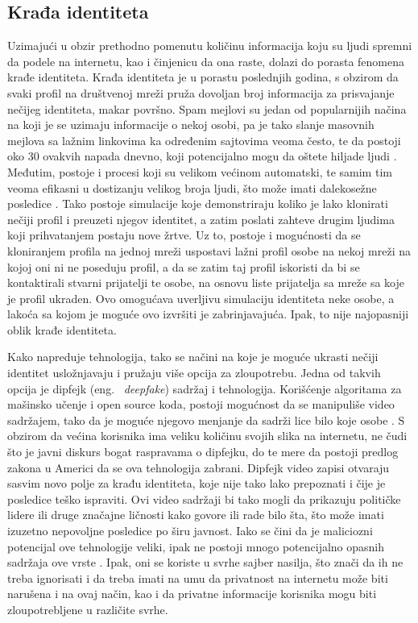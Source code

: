 \documentclass[a4paper]{article}
\begin{document}
\subsection{Krađa identiteta}
Uzimajući u obzir prethodno pomenutu količinu informacija koju su ljudi spremni da podele na internetu, kao i činjenicu da ona raste, dolazi do porasta fenomena krađe identiteta. Krađa identiteta je u porastu poslednjih godina, s obzirom da svaki profil na društvenoj mreži pruža dovoljan broj informacija za prisvajanje nečijeg identiteta, makar površno. Spam mejlovi su jedan od popularnijih načina na koji je se uzimaju informacije o nekoj osobi, pa je tako slanje masovnih mejlova sa lažnim linkovima ka određenim sajtovima veoma često, te da postoji oko 30 ovakvih napada dnevno, koji potencijalno mogu da oštete hiljade ljudi \cite{it1}. Međutim, postoje i procesi koji su velikom većinom automatski, te samim tim veoma efikasni u dostizanju velikog broja ljudi, što može imati dalekosežne posledice \cite{it2}. Tako postoje simulacije koje demonstriraju koliko je lako klonirati nečiji profil i preuzeti njegov identitet, a zatim poslati zahteve drugim ljudima koji prihvatanjem postaju nove žrtve. Uz to, postoje i mogućnosti da se kloniranjem profila na jednoj mreži uspostavi lažni profil osobe na nekoj mreži na kojoj oni ni ne poseduju profil, a da se zatim taj profil iskoristi da bi se kontaktirali stvarni prijatelji te osobe, na osnovu liste prijatelja sa mreže sa koje je profil ukraden. Ovo omogućava uverljivu simulaciju identiteta neke osobe, a lakoća sa kojom je moguće ovo izvršiti je zabrinjavajuća. Ipak, to nije najopasniji oblik krađe identiteta.
\par Kako napreduje tehnologija, tako se načini na koje je moguće ukrasti nečiji identitet usložnjavaju i pružaju više opcija za zloupotrebu. Jedna od takvih opcija je dipfejk (eng. ~{\em deepfake}) sadržaj i tehnologija. Korišćenje algoritama za mašinsko učenje i open source koda, postoji mogućnost da se manipuliše video sadržajem, tako da je moguće njegovo menjanje da sadrži lice bilo koje osobe \cite{it3}.  S obzirom da većina korisnika ima veliku količinu svojih slika na internetu, ne čudi što je javni diskurs bogat raspravama o dipfejku, do te mere da postoji predlog zakona u Americi da se ova tehnologija zabrani. Dipfejk video zapisi otvaraju sasvim novo polje za krađu identiteta, koje nije tako lako prepoznati i čije je posledice teško ispraviti. Ovi video sadržaji bi tako mogli da prikazuju političke lidere ili druge značajne ličnosti kako govore ili rade bilo šta, što može imati izuzetno nepovoljne posledice po širu javnost. Iako se čini da je maliciozni potencijal ove tehnologije veliki, ipak ne postoji mnogo potencijalno opasnih sadržaja ove vrste \cite{it4}. Ipak, oni se koriste u svrhe sajber nasilja, što znači da ih ne treba ignorisati i da treba imati na umu da privatnost na internetu može biti narušena i na ovaj način, kao i da privatne informacije korisnika mogu biti zloupotrebljene u različite svrhe.
\end{document}
